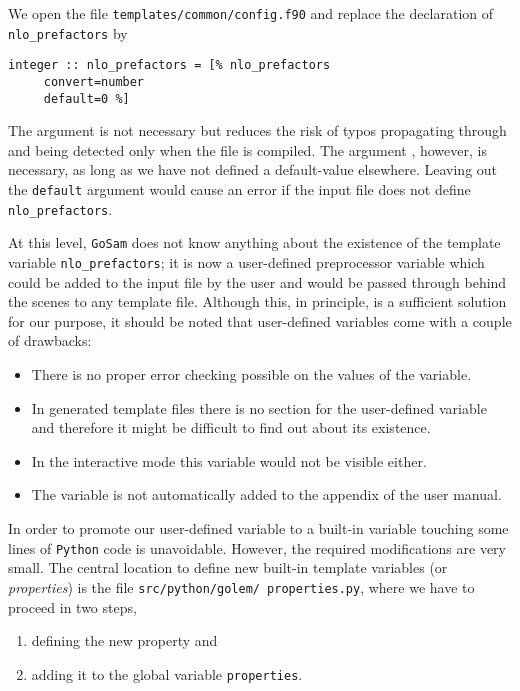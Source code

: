 \documentclass[11pt,a4paper]{refrep}
\newcommand{\golem}{{\tt GoSam}\xspace}
\newcommand{\python}{{\tt Python}\xspace}
\begin{document}
We open the file \texttt{templates/\hspace{0pt}common\hspace{0pt}/config.f90}
and replace the declaration of \texttt{nlo\_prefactors} by
\begin{lstlisting}
integer :: nlo_prefactors = [% nlo_prefactors
     convert=number
     default=0 %]
\end{lstlisting}
The argument  is not necessary but reduces the risk
of typos propagating through and being detected only when the file is
compiled. The argument , however, is necessary, as long
as we have not defined a default-value elsewhere. Leaving out the
\texttt{default} argument would cause an error if the input file does
not define \texttt{nlo\_prefactors}.

At this level, \golem{} does not know anything about the existence of
the template variable \texttt{nlo\_prefactors}; it is now a
user-defined preprocessor variable which could be added to the input
file by the user and would be passed through behind the scenes to any
template file.
Although this, in principle, is a sufficient solution for our purpose,
it should be noted that user-defined variables come with a couple of
drawbacks:
\begin{itemize}
\item There is no proper error checking possible on the values of
      the variable.
\item In generated template files there is no section for the
      user-defined variable and therefore it might be difficult
      to find out about its existence.
\item In the interactive mode this variable would not be visible
      either.
\item The variable is not automatically added to the appendix of
      the user manual.
\end{itemize}

In order to promote our user-defined variable to a built-in variable
touching some lines of \python{} code is unavoidable. However, the
required modifications are very small. The central location to define
new built-in template variables (or \emph{properties}) is the file
\texttt{src/\hspace{0pt}python/\hspace{0pt}golem/\hspace{0pt}%
properties.py}, where we have to proceed in two steps,
\begin{enumerate}
\item defining the new property and
\item adding it to the global variable \texttt{properties}.
\end{enumerate}
\end{document}
